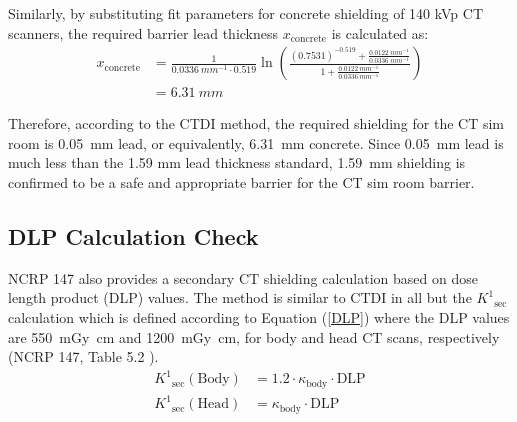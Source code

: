 \documentclass[%
aps,
mph,%
amsmath,amssymb,
preprint,%
tightenlines,
longbibliography,
superscriptaddress,
floatfix,
nofootinbib,
]{revtex4-2}
\begin{document}
        Similarly, by substituting fit parameters for concrete shielding of 140 kVp CT scanners, the required barrier lead thickness $x\mathrm{_{concrete}}$ is calculated as:
        \begin{align*}
            x\mathrm{_{concrete}} &= \frac{1}{\qty{0.0336}{mm^{-1}}\cdot0.519}\ln\left(\frac{( 0.7531)^{-0.519}+\frac{\qty{0.0122}{mm^{-1}}}{\qty{0.0336}{mm^{-1}}}}{1+ \frac{\qty{0.0122}{mm^{-1}}}{\qty{0.0336}{mm^{-1}}}} \right)\\
            &= \qty{6.31}{mm}
        \end{align*}
        
        Therefore, according to the CTDI method, the required shielding for the CT sim room is \SI{0.05}{mm} lead, or equivalently, \SI{6.31}{mm} concrete. Since \SI{0.05}{mm} lead is much less than the 1.59 mm lead thickness standard, \SI{1.59}{mm} shielding is confirmed to be a safe and appropriate barrier for the CT sim room barrier.
        
    \subsection{DLP Calculation Check} 
        NCRP 147 also provides a secondary CT shielding calculation based on dose length product (DLP) values. The method is similar to CTDI in all but the $K^1\mathrm{_{sec}}$ calculation which is defined according to Equation (\ref{DLP}) where the DLP values are \SI{550}{mGy.cm} and \SI{1200}{mGy.cm}, for body and head CT scans, respectively (NCRP 147, Table 5.2 \cite{national2004ncrp}).
        \begin{align}\label{DLP}
            K^1\mathrm{_{sec}({Body})} &= 1.2 \cdot \kappa\mathrm{_{body}} \cdot \mathrm{DLP}\\
            K^1\mathrm{_{sec}(Head)} &= \kappa\mathrm{_{body}}\cdot \mathrm{DLP}
        \end{align}
        
\end{document}
